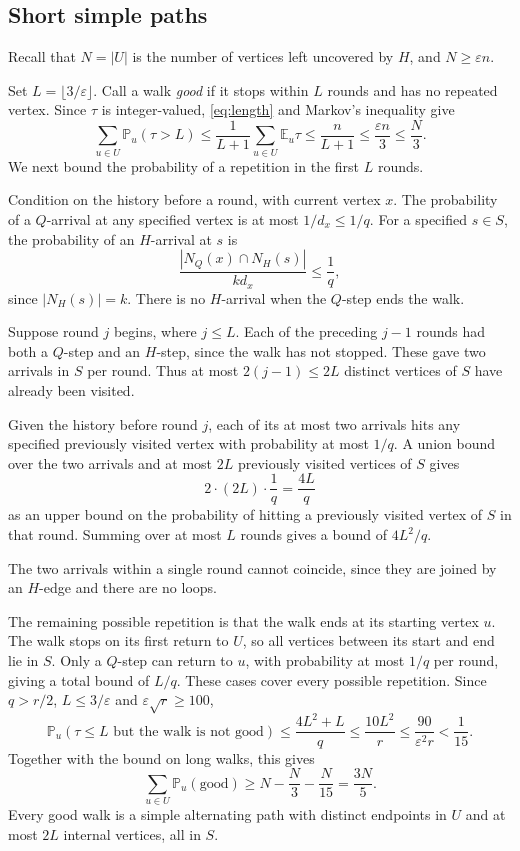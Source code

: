 \documentclass[11pt]{amsart}
\theoremstyle{remark}
\newcommand{\E}{\mathbb E}
\newcommand{\Prob}{\mathbb P}
\begin{document}
\subsection{Short simple paths}

Recall that $N=|U|$ is the number of vertices left uncovered by $H$, and $N\ge\varepsilon n$.

Set $L=\lfloor3/\varepsilon\rfloor$. Call a walk \emph{good} if it stops within $L$ rounds and has no repeated vertex. Since $\tau$ is integer-valued, \eqref{eq:length} and Markov's inequality give
\[
\sum_{u\in U}\Prob_u(\tau>L)\le\frac1{L+1}\sum_{u\in U}\E_u\tau\le\frac n{L+1}\le\frac{\varepsilon n}{3}\le\frac N3.
\]
We next bound the probability of a repetition in the first $L$ rounds.

Condition on the history before a round, with current vertex $x$. The probability of a $Q$-arrival at any specified vertex is at most $1/d_x\le1/q$. For a specified $s\in S$, the probability of an $H$-arrival at $s$ is
\[
\frac{|N_Q(x)\cap N_H(s)|}{k d_x}\le\frac1q,
\]
since $|N_H(s)|=k$. There is no $H$-arrival when the $Q$-step ends the walk.

Suppose round $j$ begins, where $j\le L$. Each of the preceding $j-1$ rounds had both a $Q$-step and an $H$-step, since the walk has not stopped. These gave two arrivals in $S$ per round. Thus at most $2(j-1)\le2L$ distinct vertices of $S$ have already been visited.

Given the history before round $j$, each of its at most two arrivals hits any specified previously visited vertex with probability at most $1/q$. A union bound over the two arrivals and at most $2L$ previously visited vertices of $S$ gives
\[
2\cdot(2L)\cdot\frac1q=\frac{4L}{q}
\]
as an upper bound on the probability of hitting a previously visited vertex of $S$ in that round. Summing over at most $L$ rounds gives a bound of $4L^2/q$.

The two arrivals within a single round cannot coincide, since they are joined by an $H$-edge and there are no loops.

The remaining possible repetition is that the walk ends at its starting vertex $u$. The walk stops on its first return to $U$, so all vertices between its start and end lie in $S$. Only a $Q$-step can return to $u$, with probability at most $1/q$ per round, giving a total bound of $L/q$. These cases cover every possible repetition. Since $q>r/2$, $L\le3/\varepsilon$ and $\varepsilon\sqrt r\ge100$,
\[
\Prob_u(\tau\le L\text{ but the walk is not good})
\le\frac{4L^2+L}{q}\le\frac{10L^2}{r}
\le\frac{90}{\varepsilon^2r}<\frac1{15}.
\]
Together with the bound on long walks, this gives
\begin{equation}\label{eq:good}
\sum_{u\in U}\Prob_u(\text{good})\ge N-\frac N3-\frac N{15}=\frac{3N}{5}.
\end{equation}
Every good walk is a simple alternating path with distinct endpoints in $U$ and at most $2L$ internal vertices, all in $S$.
\end{document}
